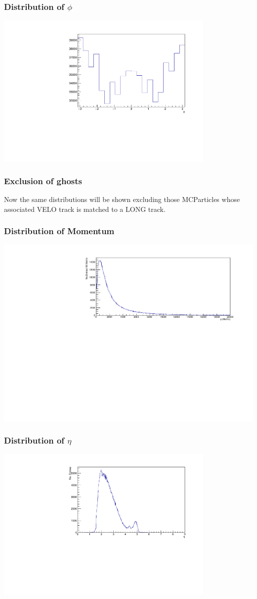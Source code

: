 \documentclass{beamer}
\begin{document}
\begin{frame}
\frametitle{Distribution of $\phi$}
\includegraphics[width=0.8\textwidth]{phi.pdf}
\end{frame}

\begin{frame}
\frametitle{Exclusion of ghosts}
Now the same distributions will be shown excluding those MCParticles whose associated VELO track is matched to a LONG track.  
\end{frame}

\begin{frame}
\frametitle{Distribution of Momentum}
\includegraphics[width=\textwidth]{pwoghosts.pdf}
\end{frame}

\begin{frame}
\frametitle{Distribution of $\eta$}
\includegraphics[width=0.8\textwidth]{etawoghosts.pdf}
\end{frame}
\end{document}
